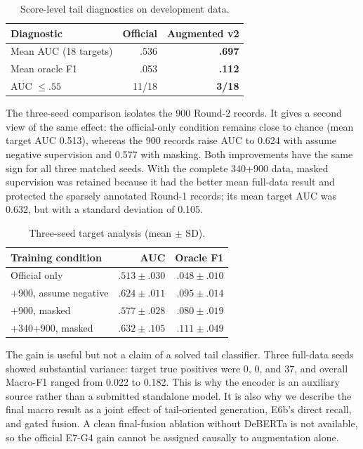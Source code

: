 \documentclass[sigconf,article,a4paper]{acmart}
\begin{document}
\begin{table}[t]
  \caption{Score-level tail diagnostics on development data.}
  \label{tab:tail}
  \small
  \begin{tabular}{@{}lrr@{}}
    \toprule
    Diagnostic & Official & Augmented v2 \\
    \midrule
    Mean AUC (18 targets) & .536 & \textbf{.697} \\
    Mean oracle F1 & .053 & \textbf{.112} \\
    AUC $\leq .55$ & 11/18 & \textbf{3/18} \\
    \bottomrule
  \end{tabular}
\end{table}

The three-seed comparison isolates the 900 Round-2 records. It gives a second
view of the same effect: the official-only condition remains close to chance
(mean target AUC 0.513), whereas the 900 records raise AUC to 0.624 with
assume negative supervision and 0.577 with masking. Both improvements have the
same sign for all three matched seeds. With the complete 340+900 data, masked
supervision was retained because it had the better mean full-data result and
protected the sparsely annotated Round-1 records; its mean target AUC was
0.632, but with a standard deviation of 0.105.

\begin{table}[t]
  \caption{Three-seed target analysis (mean $\pm$ SD).}
  \label{tab:seeds}
  \small
  \begin{tabular}{@{}lrr@{}}
    \toprule
    Training condition & AUC & Oracle F1 \\
    \midrule
    Official only & $.513\pm.030$ & $.048\pm.010$ \\
    +900, assume negative & $\mathbf{.624\pm.011}$ & $\mathbf{.095\pm.014}$ \\
    +900, masked & $.577\pm.028$ & $.080\pm.019$ \\
    +340+900, masked & $.632\pm.105$ & $.111\pm.049$ \\
    \bottomrule
  \end{tabular}
\end{table}

The gain is useful but not a claim of a solved tail classifier. Three
full-data seeds showed substantial variance: target true positives were 0, 0,
and 37, and overall Macro-F1 ranged from 0.022 to 0.182. This is why the
encoder is an auxiliary source rather than a submitted standalone model. It is
also why we describe the final macro result as a joint effect of tail-oriented
generation, E6b's direct recall, and gated fusion. A clean final-fusion
ablation without DeBERTa is not available, so the official E7-G4 gain cannot be
assigned causally to augmentation alone.
\end{document}
